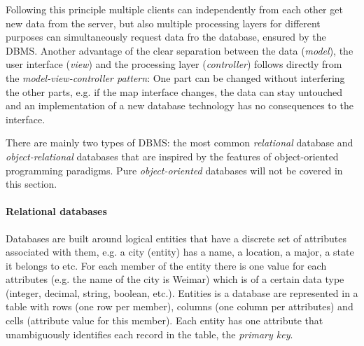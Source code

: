Following this principle multiple clients can independently from each other get new data from the server, but also multiple processing layers for different purposes can simultaneously request data fro the database, ensured by the DBMS. Another advantage of the clear separation between the data (\emph{model}), the user interface (\emph{view}) and the processing layer (\emph{controller}) follows directly from the \emph{model-view-controller pattern}: One part can be changed without interfering the other parts, e.g. if the map interface changes, the data can stay untouched and an implementation of a new database technology has no consequences to the interface.

There are mainly two types of DBMS: the most common \emph{relational} database and \emph{object-relational} databases that are inspired by the features of object-oriented programming paradigms. Pure \emph{object-oriented} databases will not be covered in this section.

\paragraph{Relational databases} %
\label{par:relational_databases}
Databases are built around logical entities that have a discrete set of attributes associated with them, e.g. a city (entity) has a name, a location, a major, a state it belongs to etc. For each member of the entity there is one value for each attributes (e.g. the name of the city is Weimar) which is of a certain data type (integer, decimal, string, boolean, etc.). Entities is a database are represented in a table with rows (one row per member), columns (one column per attributes) and cells (attribute value for this member). Each entity has one attribute that unambiguously identifies each record in the table, the \emph{primary key}.

